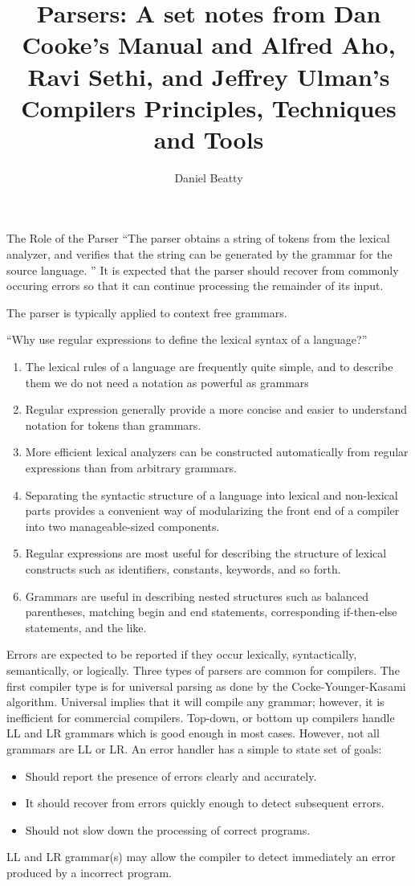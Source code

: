 \documentclass[11pt]{article}
\title{Parsers: A set notes from Dan Cooke's Manual and Alfred Aho, Ravi Sethi, and Jeffrey Ulman's Compilers Principles, Techniques and Tools}
\author{Daniel Beatty}
\begin{document}
\maketitle


 The Role of the Parser
 ``The parser obtains a string of tokens from the lexical analyzer, and verifies that the string can be generated by the grammar for the source language. ''  It is expected that the parser should recover from commonly occuring errors so that it can continue processing the remainder of its input.   
 
 The parser is typically applied to context free grammars.  
 
 ``Why use regular expressions to define the lexical syntax of a language?''
\begin{enumerate}
\item The lexical rules of a language are frequently quite simple, and to describe them we do not need a notation as powerful as grammars
\item Regular expression generally provide a more concise and easier to understand notation for tokens than grammars.
\item More efficient lexical analyzers can be constructed automatically from regular expressions than from arbitrary grammars.
\item Separating the syntactic structure of a language into lexical and non-lexical parts provides a convenient way of modularizing the front end of a compiler into two manageable-sized components.  
\item Regular expressions are most useful for describing the structure of lexical constructs such as identifiers, constants, keywords, and so forth.  
\item Grammars are useful in describing nested structures such as balanced parentheses, matching begin and end statements, corresponding if-then-else statements, and the like.
\end{enumerate}

\newpage
Errors are expected to be reported if they occur lexically, syntactically, semantically, or logically.  Three types of parsers are common for compilers.
The first compiler type is for universal parsing as done by the Cocke-Younger-Kasami algorithm.  Universal implies that it will compile any grammar; however, it is inefficient for commercial compilers.    Top-down, or bottom up compilers handle LL and LR grammars which is good enough in most cases.  However, not all grammars are LL or LR.  
An error handler has a simple to state set of goals:
\begin{itemize}
\item Should report the presence of errors clearly and accurately.
\item It should recover from errors quickly enough to detect subsequent errors.   
\item  Should not slow down the processing of correct programs.  
\end{itemize}
 LL and LR grammar(s) may allow the compiler to detect immediately an error produced by a incorrect program.  
 
\end{document}

